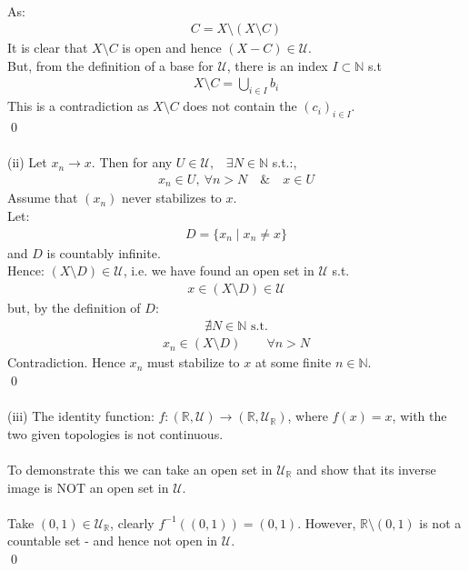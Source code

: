 \documentclass[12pt]{article}
\begin{document}
\\
As:
\begin{align*}
C=X \setminus (X \setminus C)
\end{align*}
It is clear that $X \setminus C$ is open and hence $(X-C) \in \mathcal{U}$.\\
But, from the definition of a base for $\mathcal{U}$, there is an index $I\subset\mathbb{N}$ s.t
\begin{align*}
X \setminus C=\bigcup_{i\in I} b_i
\end{align*}
This is a contradiction as $X \setminus C$ does not contain the $(c_i)_{i\in I}$.\\
\qed\\
\\
(ii) Let $x_n \to x$. Then for any $U \in \mathcal{U}, \;\;\; \exists N \in \mathbb{N}$ s.t.:,
\begin{align*}
 x_n \in U,\ \forall n>N \quad \& \quad x\in U
\end{align*}
Assume that $(x_n)$ never stabilizes to $x$. \\
Let:
\begin{align*}
D=\{x_n \mid x_n\neq x\}
\end{align*}
and $D$ is countably infinite.\\
Hence: $(X \setminus D)\in\mathcal{U}$, i.e. we have found an
open set in $\mathcal{U}$ s.t.
\begin{align*}
x\in(X \setminus D)\in\mathcal{U}
\end{align*}
but, by the definition of $D$:
\begin{align*}
\nexists N\in\mathbb{N}\text{ s.t.}
\end{align*}
\begin{align*}
x_n\in (X \setminus D) \qquad \forall n>N
\end{align*}
Contradiction. Hence $x_n$ must stabilize to $x$ at
some finite $n\in\mathbb{N}$.\\
\qed \\
\\
(iii) The identity function: $f: (\mathbb{R}, \mathcal{U}) \to (\mathbb{R}, \mathcal{U}_{\mathbb{R}})$, where $f(x)=x$, with the
two given topologies is not continuous.\\
\\
To demonstrate this we can take an open set in $\mathcal{U}_{\mathbb{R}}$ and show that its inverse
image is NOT an open set in $\mathcal{U}$.\\
\\
Take $(0,1) \in \mathcal{U}_{\mathbb{R}}$, clearly $f^{-1}((0,1)) = (0,1)$.
However, $\mathbb{R} \setminus (0,1)$ is not a countable set - and hence not open in $\mathcal{U}$.\\
\qed
\end{document}

